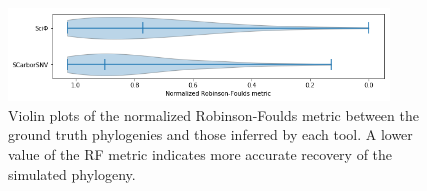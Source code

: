 \documentclass[../../main.tex]{subfiles}
\begin{document}
\begin{figure}[h] 
    \includegraphics[width=0.9\textwidth]{sections/graphics/RFviolinplots}
    \caption{Violin plots of the normalized Robinson-Foulds metric between the ground truth phylogenies and those inferred by each tool.
    A lower value of the RF metric indicates more accurate recovery of the simulated phylogeny.}
    \label{fig:RFviol}
\end{figure}
\end{document}
